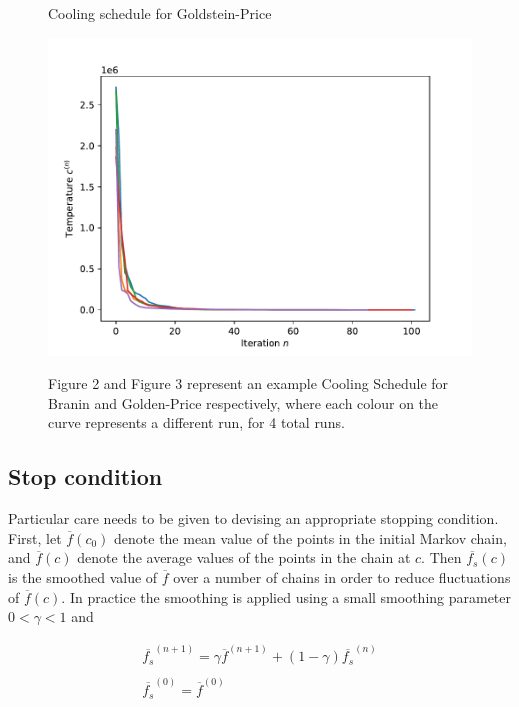 \begin{figure}[h]
    \centering
    \caption{Cooling schedule for Goldstein-Price}
    \includegraphics[scale=0.42]{figures/fig31-goldstein_price.pdf}
    \label{fig:512}
    \caption*{Figure 2 and Figure 3 represent an example Cooling Schedule for Branin and Golden-Price respectively, where each colour on the curve represents a different run, for 4 total runs.}
\end{figure}

\subsection{Stop condition}

Particular care needs to be given to devising an appropriate stopping condition.
First, let $\overline{f}(c_0)$ denote the mean value of the points in the initial Markov chain, and $\overline{f}(c)$ denote
the average values of the points in the chain at $c$. Then $\overline{f_s}(c)$ is the smoothed value of $\overline{f}$
over a number of chains in order to reduce fluctuations of $\overline{f}(c)$. In practice the smoothing is applied
using a small smoothing parameter $0 < \gamma < 1$ and

\begin{equation}
    \label{smoothing}
    \begin{array}{c}
    \overline{f_s}^{(n+1)} = \gamma \overline{f}^{(n+1)} + (1-\gamma) \overline{f_s}^{(n)} \\
    \\
    \overline{f_s}^{(0)} = \overline{f}^{(0)} \\
    \end{array}
\end{equation}

